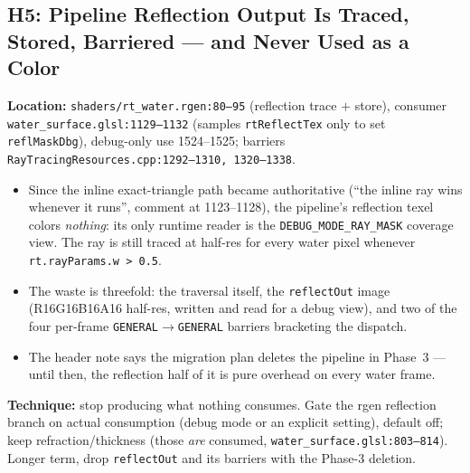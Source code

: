 \documentclass[11pt,a4paper]{article}
\begin{document}
\subsection{H5: Pipeline Reflection Output Is Traced, Stored, Barriered --- and Never Used as a Color}

\textbf{Location:} \texttt{shaders/rt\_water.rgen:80--95} (reflection trace $+$ store), consumer \texttt{water\_surface.glsl:1129--1132} (samples \texttt{rtReflectTex} only to set \texttt{reflMaskDbg}), debug-only use 1524--1525; barriers \texttt{RayTracingResources.cpp:1292--1310, 1320--1338}.

\begin{itemize}
    \item Since the inline exact-triangle path became authoritative (``the inline ray wins whenever it runs'', comment at 1123--1128), the pipeline's reflection texel colors \emph{nothing}: its only runtime reader is the \texttt{DEBUG\_MODE\_RAY\_MASK} coverage view. The ray is still traced at half-res for every water pixel whenever \texttt{rt.rayParams.w > 0.5}.
    \item The waste is threefold: the traversal itself, the \texttt{reflectOut} image (R16G16B16A16 half-res, written and read for a debug view), and two of the four per-frame \texttt{GENERAL}$\to$\texttt{GENERAL} barriers bracketing the dispatch.
    \item The header note says the migration plan deletes the pipeline in Phase~3 --- until then, the reflection half of it is pure overhead on every water frame.
\end{itemize}

\textbf{Technique:} stop producing what nothing consumes. Gate the rgen reflection branch on actual consumption (debug mode or an explicit setting), default off; keep refraction/thickness (those \emph{are} consumed, \texttt{water\_surface.glsl:803--814}). Longer term, drop \texttt{reflectOut} and its barriers with the Phase-3 deletion.
\end{document}
